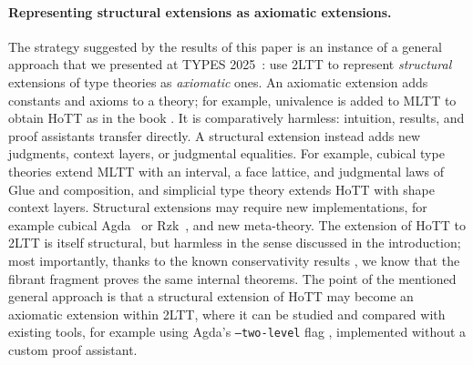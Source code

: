 
\paragraph{Representing structural extensions as axiomatic extensions.}
The strategy suggested by the results of this paper is an instance of a general approach that we presented at TYPES 2025~\citep{KdJ_representing}:
use 2LTT to represent \emph{structural} extensions of type theories as
\emph{axiomatic} ones. An axiomatic extension adds constants and axioms
to a theory; for example, univalence is added to MLTT to obtain HoTT as in the book \citep{HoTTBook}. It
is comparatively harmless: intuition, results, and proof assistants
transfer directly. A structural extension instead adds new judgments,
context layers, or judgmental equalities. For example,
cubical type theories extend MLTT with an
interval, a face lattice, and judgmental laws of Glue and
composition, and simplicial type theory \citep{RS2017} extends HoTT with
shape context layers.
Structural extensions may require new implementations, for example cubical Agda~\citep{CubicalAgda} or
Rzk~\citep{rzk}, and new meta-theory. The extension of HoTT to
2LTT is itself structural, but harmless in the sense discussed in the introduction;
most importantly, thanks to the known
conservativity results \citep{2LTT,andras-staging,BocquetThesis}, we know that the fibrant fragment
proves the same internal theorems.
The point of the mentioned general approach is that a
structural extension of HoTT may become an axiomatic
extension within 2LTT, where it can be studied and compared with existing
tools, for example using Agda's \texttt{--two-level} flag
\citep{agdareadthedocs}, implemented without a custom proof assistant.

